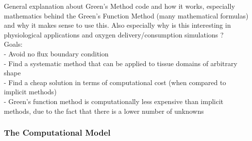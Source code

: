 General explanation about Green's Method code and how it works, especially mathematics behind the Green's Function Method (many mathematical formulas) and why it makes sense to use this. Also especially why is this interesting in physiological applications and oxygen delivery/consumption simulations ?
\\Goals:
\\- Avoid no flux boundary condition
\\- Find a systematic method that can be applied to tissue domains of arbitrary shape
\\- Find a cheap solution in terms of computational cost (when compared to implicit methods)
\\- Green's function method is computationally less expensive than implicit methods, due to the fact that there is a lower number of unknowns

\subsubsection*{The Computational Model}

